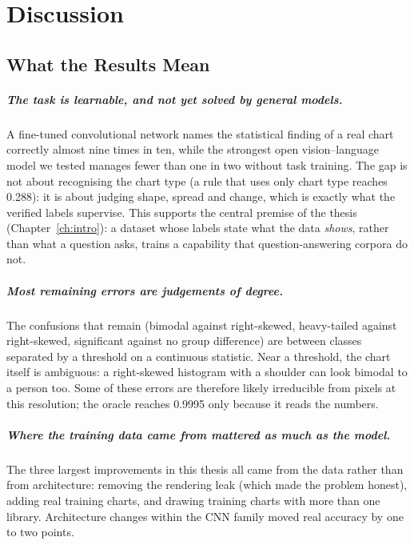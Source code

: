 \chapter{Discussion}
\label{ch:discussion}

\section{What the Results Mean}

\paragraph{The task is learnable, and not yet solved by general models.} A fine-tuned
convolutional network names the statistical finding of a real chart correctly almost
nine times in ten, while the strongest open vision--language model we tested manages
fewer than one in two without task training. The gap is not about recognising the chart
type (a rule that uses only chart type reaches 0.288): it is about judging shape, spread
and change, which is exactly what the verified labels supervise. This supports the
central premise of the thesis (Chapter~\ref{ch:intro}): a dataset whose labels state
what the data \emph{shows}, rather than what a question asks, trains a capability that
question-answering corpora do not.

\paragraph{Most remaining errors are judgements of degree.} The confusions that remain
(bimodal against right-skewed, heavy-tailed against right-skewed, significant against
no group difference) are between classes separated by a threshold on a continuous
statistic. Near a threshold, the chart itself is ambiguous: a right-skewed histogram
with a shoulder can look bimodal to a person too. Some of these errors are therefore
likely irreducible from pixels at this resolution; the oracle reaches 0.9995 only
because it reads the numbers.

\paragraph{Where the training data came from mattered as much as the model.} The three
largest improvements in this thesis all came from the data rather than from
architecture: removing the rendering leak (which made the problem honest), adding real
training charts, and drawing training charts with more than one library. Architecture
changes within the CNN family moved real accuracy by one to two points.

